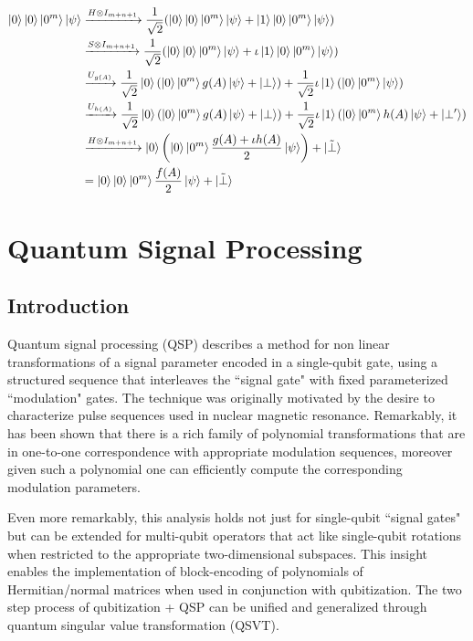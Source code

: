 \documentclass[12pt, oneside]{book}
\theoremstyle{definition}
\theoremstyle{definition}
\theoremstyle{remark}
\begin{document}
\begin{align*}
    \ket{0}\ket{0}\ket{0^m}\ket{\psi} &\xrightarrow{H\otimes I_{m+n+1}} \frac{1}{\sqrt{2}}(\ket{0}\ket{0}\ket{0^m}\ket{\psi}+\ket{1}\ket{0}\ket{0^m}\ket{\psi})\\
    &\xrightarrow{S\otimes I_{m+n+1}} \frac{1}{\sqrt{2}}(\ket{0}\ket{0}\ket{0^m}\ket{\psi}+\iota\ket{1}\ket{0}\ket{0^m}\ket{\psi})\\
    &\xrightarrow{U_{g(A)}} \frac{1}{\sqrt{2}}\ket{0}(\ket{0}\ket{0^m}g(A)\ket{\psi} + \ket{\perp}) + \frac{1}{\sqrt{2}} \iota\ket{1}(\ket{0}\ket{0^m}\ket{\psi})\\
    &\xrightarrow{U_{h(A)}} \frac{1}{\sqrt{2}}\ket{0}(\ket{0}\ket{0^m}g(A)\ket{\psi} + \ket{\perp}) + \frac{1}{\sqrt{2}} \iota \ket{1}(\ket{0}\ket{0^m}h(A)\ket{\psi}+\ket{\perp'})\\
    &\xrightarrow{H\otimes I_{m+n+1}} \ket{0}\left(\ket{0}\ket{0^m} \frac{g(A)+\iota h(A)}{2}\ket{\psi}\right) + \ket{\tilde{\perp}}\\
    &= \ket{0}\ket{0}\ket{0^m}\frac{f(A)}{2}\ket{\psi} + \ket{\tilde{\perp}}
\end{align*}
\chapter{Quantum Signal Processing}

\section{Introduction}
Quantum signal processing (QSP) describes a method for non linear transformations of a signal parameter encoded in a single-qubit gate, using a structured sequence that interleaves the ``signal gate" with fixed parameterized ``modulation" gates. The technique was originally motivated by the desire to characterize pulse sequences used in nuclear magnetic resonance. Remarkably, it has been shown that there is a rich family of polynomial transformations that are in one-to-one correspondence with appropriate modulation sequences, moreover given such a polynomial one can efficiently compute the corresponding modulation parameters.

Even more remarkably, this analysis holds not just for single-qubit ``signal gates" but can be extended for multi-qubit operators that act like single-qubit rotations when restricted to the appropriate two-dimensional subspaces. This insight enables the implementation of block-encoding of polynomials of Hermitian/normal matrices when used in conjunction with qubitization. The two step process of qubitization + QSP can be unified and generalized through quantum singular value transformation (QSVT).
\end{document}
